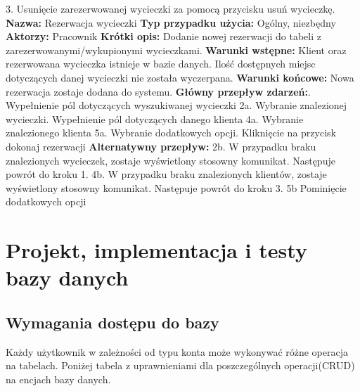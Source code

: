\documentclass[polish,polish,a4paper]{article}
\begin{document}
3. Usunięcie zarezerwowanej wycieczki za pomocą przycisku usuń wycieczkę.\newline
\newline
\textbf{Nazwa:} Rezerwacja wycieczki\newline
\textbf{Typ przypadku użycia:} Ogólny, niezbędny\newline
\textbf{Aktorzy:} Pracownik\newline
\textbf{Krótki opis:} Dodanie nowej rezerwacji do tabeli z zarezerwowanymi/wykupionymi wycieczkami.\newline
\textbf{Warunki wstępne:} Klient oraz rezerwowana wycieczka istnieje w bazie danych. Ilość dostępnych\newline
miejsc dotyczących danej wycieczki nie została wyczerpana.\newline
\textbf{Warunki końcowe:} Nowa rezerwacja zostaje dodana do systemu.\newline
\textbf{Główny przepływ zdarzeń:}. Wypełnienie pól dotyczących wyszukiwanej wycieczki\newline
2a. Wybranie znalezionej wycieczki. Wypełnienie pól dotyczących danego klienta\newline
4a. Wybranie znalezionego klienta\newline
5a. Wybranie dodatkowych opcji. Kliknięcie na przycisk dokonaj rezerwacji\newline
\textbf{Alternatywny przepływ:}\newline
2b. W przypadku braku znalezionych wycieczek, zostaje wyświetlony stosowny komunikat.\newline
Następuje powrót do kroku 1.\newline
4b. W przypadku braku znalezionych klientów, zostaje wyświetlony stosowny komunikat.\newline
Następuje powrót do kroku 3.\newline
5b Pominięcie dodatkowych opcji
\section{Projekt, implementacja i testy bazy danych}
\subsection{Wymagania dostępu do bazy}
Każdy użytkownik w zależności od typu konta może wykonywać różne operacja na tabelach. Poniżej tabela z uprawnieniami dla poszczególnych operacji(CRUD) na encjach bazy danych.
\end{document}

